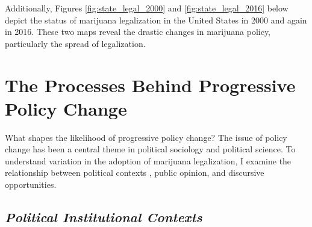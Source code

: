 

%

Additionally, Figures \ref{fig:state_legal_2000} and \ref{fig:state_legal_2016} below depict the status of marijuana legalization in the United States in 2000 and again in 2016. These two maps reveal the drastic changes in marijuana policy, particularly the spread of legalization. 




  



\section{The Processes Behind Progressive Policy Change}




What shapes the likelihood of progressive policy change? The issue of policy change has been a central theme in political sociology and political science. To understand variation in the adoption of marijuana legalization, I examine the relationship between political contexts%
, public opinion, and discursive opportunities.


\subsection{\it{Political Institutional Contexts}}

